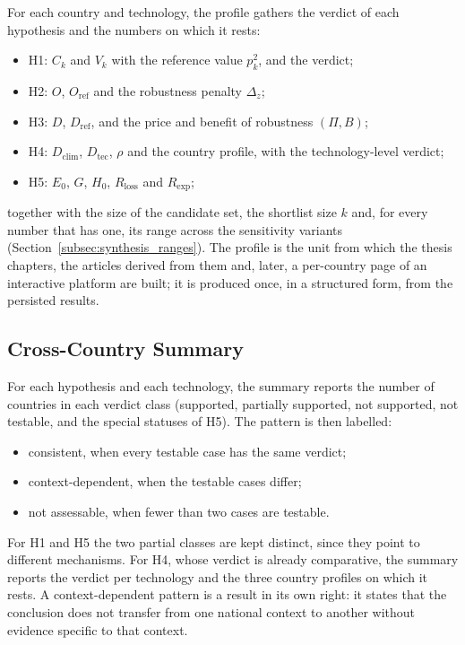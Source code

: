 For each country and technology, the profile gathers the verdict of each
hypothesis and the numbers on which it rests:
\begin{itemize}
    \item H1: $C_k$ and $V_k$ with the reference value $p_k^2$, and the verdict;
    \item H2: $O$, $O_{\mathrm{ref}}$ and the robustness penalty $\Delta_z$;
    \item H3: $D$, $D_{\mathrm{ref}}$, and the price and benefit of robustness
    $(\Pi,B)$;
    \item H4: $D_{\mathrm{clim}}$, $D_{\mathrm{tec}}$, $\rho$ and the country
    profile, with the technology-level verdict;
    \item H5: $E_0$, $G$, $H_0$, $R_{\mathrm{loss}}$ and $R_{\mathrm{exp}}$;
\end{itemize}
together with the size of the candidate set, the shortlist size $k$ and, for
every number that has one, its range across the sensitivity variants
(Section~\ref{subsec:synthesis_ranges}). The profile is the unit from which the
thesis chapters, the articles derived from them and, later, a per-country page
of an interactive platform are built; it is produced once, in a structured form,
from the persisted results.

\subsection{Cross-Country Summary}
\label{subsec:synthesis_summary}

For each hypothesis and each technology, the summary reports the number of
countries in each verdict class (supported, partially supported, not supported,
not testable, and the special statuses of H5). The pattern is then labelled:
\begin{itemize}
    \item consistent, when every testable case has the same verdict;
    \item context-dependent, when the testable cases differ;
    \item not assessable, when fewer than two cases are testable.
\end{itemize}
For H1 and H5 the two partial classes are kept distinct, since they point to
different mechanisms. For H4, whose verdict is already comparative, the summary
reports the verdict per technology and the three country profiles on which it
rests. A context-dependent pattern is a result in its own right: it states that
the conclusion does not transfer from one national context to another without
evidence specific to that context.

